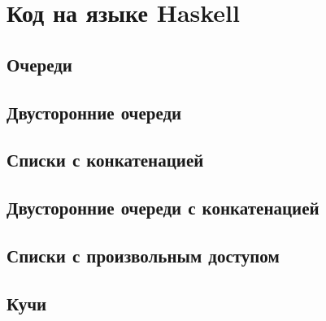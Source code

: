 \appendix
\chapter{Код на языке Haskell}
\label{app:A}
\lstset{language=Haskell}
\section{Очереди}

\codesep

\codesep

\codesep

\codesep

\codesep

\codesep


\section{Двусторонние очереди}

\codesep


\section{Списки с конкатенацией}

\codesep


\section{Двусторонние очереди с конкатенацией}

\codesep

\codesep


\section{Списки с произвольным доступом}

\codesep

\codesep

\codesep


\section{Кучи}

\codesep

\codesep

\codesep

\codesep

\codesep

\codesep

\codesep


